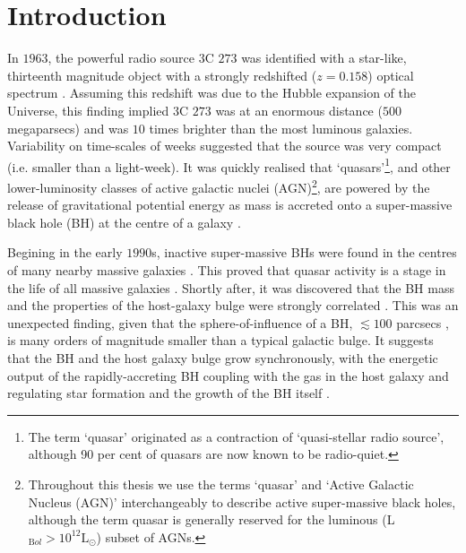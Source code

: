 
\chapter{Introduction}
\label{ch:intro}

In $1963$, the powerful radio source $3$C $273$ was identified with a star-like, thirteenth magnitude object with a strongly redshifted ($z=0.158$)  optical spectrum \citep{schmidt63}. 
Assuming this redshift was due to the Hubble expansion of the Universe, this finding implied $3$C $273$ was at an enormous distance ($500$ megaparsecs) and was $10$ times brighter than the most luminous galaxies. 
Variability on time-scales of weeks suggested that the source was very compact (i.e. smaller than a light-week).
It was quickly realised that `quasars'\footnote{The term `quasar' originated as a contraction of `quasi-stellar radio source', although 90 per cent of quasars are now known to be radio-quiet.}, and other lower-luminosity classes of active galactic nuclei (AGN)\footnote{Throughout this thesis we use the terms `quasar' and `Active Galactic Nucleus (AGN)' interchangeably to describe active super-massive black holes, although the term quasar is generally reserved for the luminous (L$_{\mathrm Bol} > 10^{12}{\mathrm L}_{\odot}$) subset of AGNs.}, are powered by the release of gravitational potential energy as mass is accreted onto a super-massive  black hole (BH) at the centre of a galaxy \citep[e.g.][]{hoyle63,salpeter64,lynden-bell69,lynden-bell71}. 

Begining in the early $1990$s, inactive super-massive BHs were found in the centres of many nearby massive galaxies \citep[e.g.][]{kormendy95,ferrarese05,kormendy13}.
This proved that quasar activity is a stage in the life of all massive galaxies \citep[e.g.][]{lynden-bell69}. 
Shortly after, it was discovered that the BH mass and the properties of the host-galaxy bulge were strongly correlated \citep[e.g. the M$_{\mathrm BH}$-$\sigma$ relation;][]{ferrarese00,gebhardt00,graham01,tremaine02,marconi03,aller07,gultekin09}. 
This was an unexpected finding, given that the sphere-of-influence  of a BH, $\lesssim100$ parcsecs \citep[e.g.][]{kormendy13}, is many orders of magnitude smaller than a typical galactic bulge. 
It suggests that the BH and the host galaxy bulge grow synchronously, with the energetic output of the rapidly-accreting BH coupling with the gas in the host galaxy and regulating star formation and the growth of the BH itself \citep[e.g.][]{silk98,king03,dimatteo05,king15}. 

